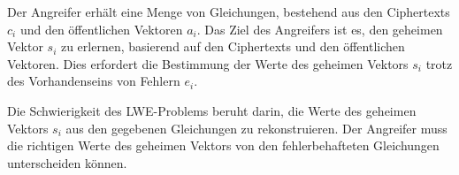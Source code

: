 Der Angreifer erhält eine Menge von Gleichungen, bestehend aus den Ciphertexts $c_i$ und den öffentlichen Vektoren $a_i$. 
Das Ziel des Angreifers ist es, den geheimen Vektor $s_i$ zu erlernen, basierend auf den Ciphertexts und den öffentlichen Vektoren. 
Dies erfordert die Bestimmung der Werte des geheimen Vektors $s_i$ trotz des Vorhandenseins von Fehlern $e_i$.

Die Schwierigkeit des LWE-Problems beruht darin, die Werte des geheimen Vektors $s_i$ aus den gegebenen Gleichungen zu rekonstruieren. 
Der Angreifer muss die richtigen Werte des geheimen Vektors von den fehlerbehafteten Gleichungen unterscheiden können.

